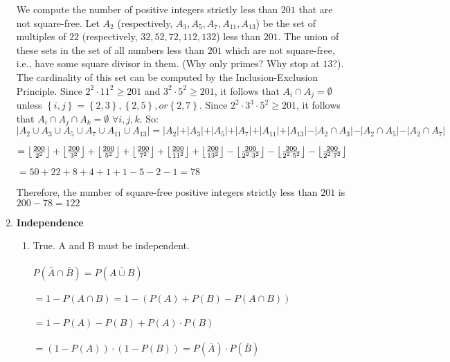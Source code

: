 \documentclass[11pt]{article}
\DeclarePairedDelimiter\floor{\lfloor}{\rfloor}
\begin{document}
\begin{enumerate}
		We compute the number of positive integers strictly less than $201$ that are not square-free. Let $A_2$
		(respectively, $A_3, A_5, A_7, A_{11}, A_{13}$) be the set of multiples of $22$ (respectively, $32, 52, 72, 112, 132$) less than
		$201$. The union of these sets in the set of all numbers less than $201$ which are not square-free, i.e., have
		some square divisor in them. (Why only primes? Why stop at $13$?). \\
		The cardinality of this set can be computed by the Inclusion-Exclusion Principle. Since $2^2 \cdot 11^2 \ge 201$ and
		$3^2 \cdot 5^2 \ge 201$, it follows that $A_i \cap A_j = \emptyset $ unless $ \left\{ i, j \right\} = \left\{ 2, 3 \right\}, \left\{ 2, 5 \right\}, or \left\{ 2, 7 \right\}$. Since $2^2 \cdot 3^3 \cdot 5^2 \ge 201$, it follows
		that $A_i \cap A_j \cap A_k = \emptyset$ $\forall i, j, k$. So: \\
		
		$\vert A_2 \cup A_3 \cup A_5 \cup A_7 \cup A_{11} \cup A_{13}\vert
		= \vert A_2 \vert + \vert A_3 \vert + \vert A_5 \vert + \vert A_7 \vert + \vert A_{11} \vert + \vert A_{13} \vert - \vert A_2 \cap A_3 \vert -  \vert A_2 \cap A_5 \vert - \vert A_2 \cap A_7 \vert $
		
		$=  \floor*{\frac{200}{2^2}} + \floor*{\frac{200}{3^2}} + \floor*{\frac{200}{5^2}} + \floor*{\frac{200}{7^2}} + \floor*{\frac{200}{11^2}} + \floor*{\frac{200}{13^2}} - \floor*{\frac{200}{2^2 \cdot 3^2}} - \floor*{\frac{200}{2^2 \cdot 5^2}} - \floor*{\frac{200}{2^2 \cdot 7^2}} $
		
		$= 50 +22 +8 +4 +1 +1 - 5 - 2 - 1 = 78$
		
		Therefore, the number of square-free positive integers strictly less than $201$ is $200 - 78 = 122$
		
		\item \textbf{Independence}
			
			\begin{enumerate}
				\item True. A and B must be independent. \\\\
				$P(\overline{A} \cap \overline{B}) = P(\overline{A \cup B})$ \\\\
				$= 1 - P(A \cap B) = 1 - (P(A) + P(B) - P(A \cap B))$ \\\\
				$= 1 - P(A) - P(B) + P(A) \cdot P(B)$\\\\
				$= (1 - P(A)) \cdot (1 - P(B)) = P(\overline{A}) \cdot P(\overline{B}) $ \\
				

\end{enumerate}
\end{enumerate}
\end{document}
